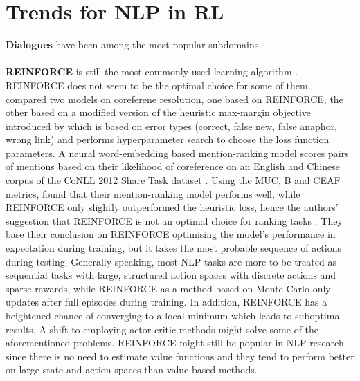 \documentclass[11pt,a4paper]{article}
\begin{document}
\section{Trends for NLP in RL}
\textbf{Dialogues} have been among the most popular subdomains.\\\\ 
\textbf{REINFORCE} is still the most commonly used learning algorithm \citep{yasui-etal-2019, zhang-2018, hu-etal-2018-playing, godin-etal-2019-learning, huang-etal-2018-neural, mao-etal-2018-end, ranzato2015sequence, wu-etal-2018-study, clark-manning-2016-deep,yogatama-2017, guu-etal-2017-language, zeng-2018}. REINFORCE does not seem to be the optimal choice for some of them. \citet{clark-manning-2016-deep} compared two models on coreferene resolution, one based on REINFORCE, the other based on a modified version of the heuristic max-margin objective introduced by \citep{wiseman-etal-2015-learning} which is based on error types (correct, false new, false anaphor, wrong link) and performs hyperparameter search to choose the loss function parameters. A neural word-embedding based mention-ranking model scores pairs of mentions based on their likelihood of coreference on an English and Chinese corpus of the CoNLL 2012 Share Task dataset \citet{conll-2012}. Using the MUC, B and CEAF metrics, \citet{clark-manning-2016-deep} found that their mention-ranking model performs well, while REINFORCE only slightly outperformed the heuristic loss, hence the authors' suggestion that REINFORCE is not an optimal choice for ranking tasks \citet{grishman-sundheim-1996-message, cai-strube-2010-evaluation}. They base their conclusion on REINFORCE optimising the model's performance in expectation during training, but it takes the most probable sequence of actions during testing. Generally speaking, most NLP tasks are more to be treated as sequential tasks with large, structured action spaces with discrete actions and sparse rewards, while REINFORCE as a method based on Monte-Carlo only updates after full episodes during training. In addition, REINFORCE has a heightened chance of converging to a local minimum which leads to suboptimal results. A shift to employing actor-critic methods might solve some of the aforementioned problems. REINFORCE might still be popular in NLP research since there is no need to estimate value functions and they tend to perform better on large state and action spaces than value-based methods. \\\\
\end{document}
